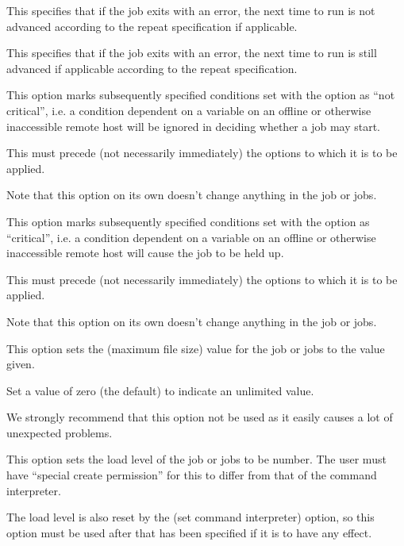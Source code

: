 This specifies that if the job exits with an error, the next time to run is not advanced according to the repeat specification if applicable.


This specifies that if the job exits with an error, the next time to run is still advanced if applicable according to the repeat
specification.


This option marks subsequently specified conditions set with the  option as ``not critical'',
i.e. a condition dependent on a variable on an offline or otherwise inaccessible remote host will be ignored in
deciding whether a job may start.

This must precede (not necessarily immediately) the  options to which it is to be applied.

Note that this option on its own doesn't change anything in the job or jobs.


This option marks subsequently specified conditions set with the  option as ``critical'', i.e. a condition dependent on a
variable on an offline or otherwise inaccessible remote host will cause the job to be held up.

This must precede (not necessarily immediately) the  options to which it is to be applied.

Note that this option on its own doesn't change anything in the job or jobs.


This option sets the  (maximum file size) value for the job or jobs to the value given.

Set a value of zero (the default) to indicate an unlimited value.

We strongly recommend that this option not be used as it easily causes a lot of unexpected problems.


This option sets the load level of the job or jobs to be number. The user must have ``special create permission'' for this to differ from that of the
command interpreter.

The load level is also reset by the  (set command interpreter) option, so this option must be used after that has been specified
if it is to have any effect.

